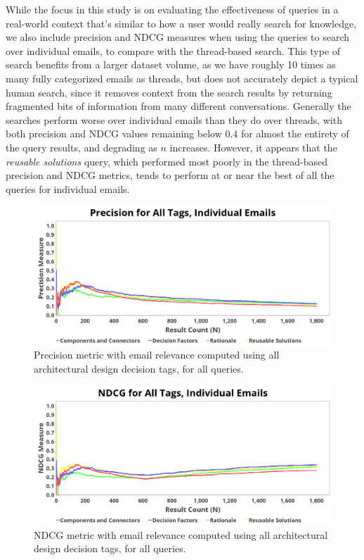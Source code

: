 \documentclass[a4paper, 12pt]{article}
\begin{document}
		While the focus in this study is on evaluating the effectiveness of queries in a real-world context that's similar to how a user would really search for knowledge, we also include precision and NDCG measures when using the queries to search over individual emails, to compare with the thread-based search. This type of search benefits from a larger dataset volume, as we have roughly 10 times as many fully categorized emails as threads, but does not accurately depict a typical human search, since it removes context from the search results by returning fragmented bits of information from many different conversations. Generally the searches perform worse over individual emails than they do over threads, with both precision and NDCG values remaining below $ 0.4 $ for almost the entirety of the query results, and degrading as $ n $ increases. However, it appears that the \textit{reusable solutions} query, which performed most poorly in the thread-based precision and NDCG metrics, tends to perform at or near the best of all the queries for individual emails.
		
		\begin{figure}
			\centering
			\includegraphics[width=\textwidth]{report/all_tags_email_precision.png}
			\caption{Precision metric with email relevance computed using all architectural design decision tags, for all queries.}
			\label{fig:precisionemailall}
		\end{figure}
		
		\begin{figure}
			\centering
			\includegraphics[width=\textwidth]{report/all_tags_email_ndcg.png}
			\caption{NDCG metric with email relevance computed using all architectural design decision tags, for all queries.}
			\label{fig:ndcgemailall}
		\end{figure}
\end{document}
